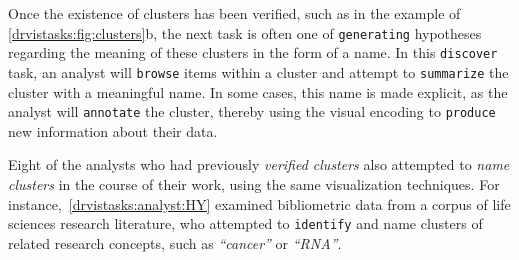 



Once the existence of clusters has been verified, such as in the example of \autoref{drvistasks:fig:clusters}b, the next task is often one of {\tt generating} hypotheses regarding the meaning of these clusters in the form of a name.
In this {\tt discover} task, an analyst will {\tt browse} items within a cluster and attempt to {\tt summarize} the cluster with a meaningful name. 
In some cases, this name is made explicit, as the analyst will {\tt annotate} the cluster, thereby using the visual encoding to {\tt produce} new information about their data. 

Eight of the analysts who had previously {\it verified clusters} also attempted to {\it name clusters} in the course of their work, using the same visualization techniques. 
For instance,~\ref{drvistasks:analyst:HY} examined bibliometric data from a corpus of life sciences research literature, who attempted to {\tt identify} and name clusters of related research concepts, such as {\it ``cancer''} or {\it ``RNA''}.





